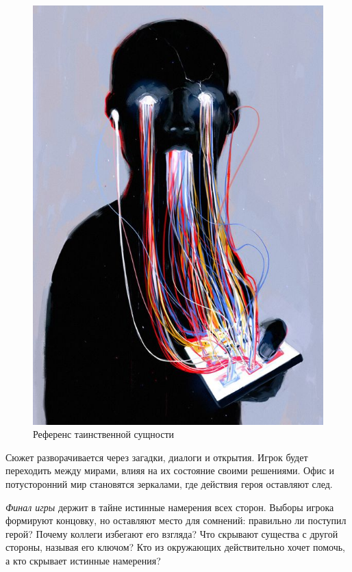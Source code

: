 \documentclass{article}
\begin{document}
\begin{figure}[h]
\begin{minipage}{0.4\textwidth}
			\includegraphics[width=\textwidth]{images/entity4.jpg}
			\caption{Референс таинственной сущности}
			\label{fig:entity2}
		\end{minipage}
	\end{figure}
	
	
	Сюжет разворачивается через загадки, диалоги и открытия. Игрок будет переходить между мирами, влияя на их состояние своими решениями. Офис и потусторонний мир становятся зеркалами, где действия героя оставляют след.
	
	\textit{Финал игры} держит в тайне истинные намерения всех сторон. Выборы игрока формируют концовку, но оставляют место для сомнений: правильно ли поступил герой? Почему коллеги избегают его взгляда? Что скрывают существа с другой стороны, называя его ключом? Кто из окружающих действительно хочет помочь, а кто скрывает истинные намерения? \\
	
\end{document}
